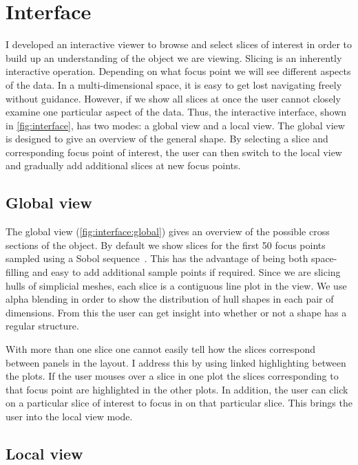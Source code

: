 \section{Interface}
\label{sec:interface}

I developed an interactive viewer to browse and select slices of interest in
order to build up an understanding of the object we are viewing. Slicing is an
inherently interactive operation. Depending on what focus point 
we will see different aspects of the data. In a multi-dimensional
space, it is easy to get lost navigating freely without guidance.
However, if we show all slices at once the user cannot closely examine one
particular aspect of the data.  Thus, the interactive interface, shown in
\autoref{fig:interface}, has two modes: a global view and a local view. The
global view is designed to give an overview of the general shape.  By selecting 
a slice and corresponding focus point of interest, the user can then
switch to the local view and gradually add additional slices at new focus
points.

\subsection{Global view}

The global view (\autoref{fig:interface:global}) gives an overview of the
possible cross sections of the object. By default we show slices for the first
50 focus points sampled using a Sobol sequence~\cite{Sobol:1967}. This has the
advantage of being both space-filling and easy to add additional sample points
if required. Since we are slicing hulls of simplicial meshes, each slice is a contiguous
line plot in the view. We use alpha blending in order to show the distribution
of hull shapes in each pair of dimensions. 
From this the user can get insight into whether or not a shape has a regular 
structure.

With more than one slice one cannot easily tell how the slices correspond 
between panels in the layout. I address this by using linked highlighting
between the plots. If the user mouses over a slice in one plot the slices
corresponding to that focus point are highlighted in the other plots. In 
addition, the user can click on a particular slice of interest to focus in 
on that particular slice. This brings the user into the local view mode.

\subsection{Local view}

